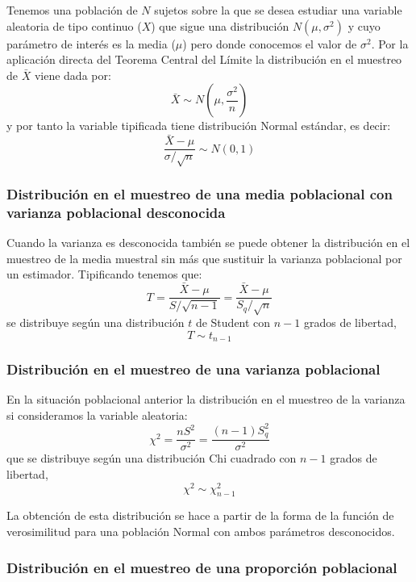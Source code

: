 \documentclass[
]{book}
\begin{document}
Tenemos una población de \(N\) sujetos sobre la que se desea estudiar una variable aleatoria de tipo continuo (\(X\)) que sigue una distribución \(N(\mu,\sigma^2)\) y cuyo parámetro de interés es la media (\(\mu\)) pero donde conocemos el valor de \(\sigma^2\). Por la aplicación directa del Teorema Central del Límite la distribución en el muestreo de \(\bar X\) viene dada por: \[\bar X \sim N\left(\mu,\frac{\sigma^2}{n}\right)\] y por tanto la variable tipificada tiene distribución Normal estándar, es decir: \[\frac{\bar X - \mu}{\sigma/\sqrt n} \sim N(0,1)\]

\hypertarget{distribuciuxf3n-en-el-muestreo-de-una-media-poblacional-con-varianza-poblacional-desconocida}{%
\subsubsection{Distribución en el muestreo de una media poblacional con varianza poblacional desconocida}\label{distribuciuxf3n-en-el-muestreo-de-una-media-poblacional-con-varianza-poblacional-desconocida}}

Cuando la varianza es desconocida también se puede obtener la distribución en el muestreo de la media muestral sin más que sustituir la varianza poblacional por un estimador. Tipificando tenemos que: \[T = \frac{\bar{X} - \mu}{S/\sqrt{n-1}} = \frac{\bar{X} - \mu}{S_q/\sqrt{n}}\] se distribuye según una distribución \(t\) de Student con \(n-1\) grados de libertad, \[ T \sim t_{n-1}\]

\hypertarget{distribuciuxf3n-en-el-muestreo-de-una-varianza-poblacional}{%
\subsubsection{Distribución en el muestreo de una varianza poblacional}\label{distribuciuxf3n-en-el-muestreo-de-una-varianza-poblacional}}

En la situación poblacional anterior la distribución en el muestreo de la varianza si consideramos la variable aleatoria: \[\chi^2 = \frac{nS^2}{\sigma^2} = \frac{(n-1)S_q^2}{\sigma^2}\] que se distribuye según una distribución Chi cuadrado con \(n-1\) grados de libertad, \[ \chi^2 \sim \chi^2_{n-1}\]

La obtención de esta distribución se hace a partir de la forma de la función de verosimilitud para una población Normal con ambos parámetros desconocidos.

\hypertarget{distribuciuxf3n-en-el-muestreo-de-una-proporciuxf3n-poblacional}{%
\subsubsection{Distribución en el muestreo de una proporción poblacional}\label{distribuciuxf3n-en-el-muestreo-de-una-proporciuxf3n-poblacional}}
\end{document}
